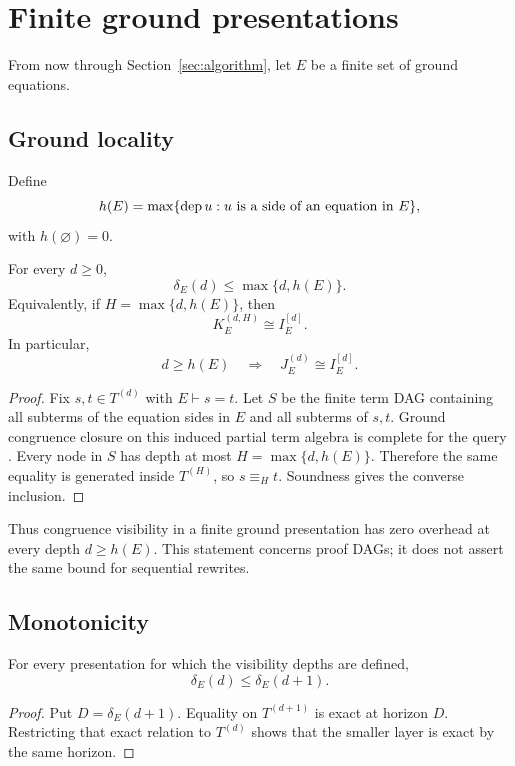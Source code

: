 \section{Finite ground presentations}\label{sec:ground}

From now through Section~\ref{sec:algorithm}, let $E$ be a finite set of ground equations.

\subsection{Ground locality}

Define
\[
h(E)=\max\{\operatorname{dep} u:u\text{ is a side of an equation in }E\},
\]
with $h(\varnothing)=0$.

\begin{theorem}\label{thm:groundlocality}
For every $d\ge0$,
\[
\boxed{\delta_E(d)\le\max\{d,h(E)\}}.
\]
Equivalently, if $H=\max\{d,h(E)\}$, then
\[
K_E^{(d,H)}\cong I_E^{[d]}.
\]
In particular,
\[
d\ge h(E)\quad\Longrightarrow\quad J_E^{(d)}\cong I_E^{[d]}.
\]
\end{theorem}

\begin{proof}
Fix $s,t\in T^{(d)}$ with $E\vdash s=t$.  Let $S$ be the finite term DAG containing all subterms of the equation sides in $E$ and all subterms of $s,t$.  Ground congruence closure on this induced partial term algebra is complete for the query \cite{NelsonOppen1980,DowneySethiTarjan1980,Kapur1997}.  Every node in $S$ has depth at most $H=\max\{d,h(E)\}$.  Therefore the same equality is generated inside $T^{(H)}$, so $s\equiv_H t$.  Soundness gives the converse inclusion.
\end{proof}

Thus congruence visibility in a finite ground presentation has zero overhead at every depth $d\ge h(E)$. This statement concerns proof DAGs; it does not assert the same bound for sequential rewrites.

\subsection{Monotonicity}

\begin{proposition}[Monotonicity]\label{prop:monotone}
For every presentation for which the visibility depths are defined,
\[
\boxed{\delta_E(d)\le\delta_E(d+1)}.
\]
\end{proposition}

\begin{proof}
Put $D=\delta_E(d+1)$.  Equality on $T^{(d+1)}$ is exact at horizon $D$.  Restricting that exact relation to $T^{(d)}$ shows that the smaller layer is exact by the same horizon.
\end{proof}


